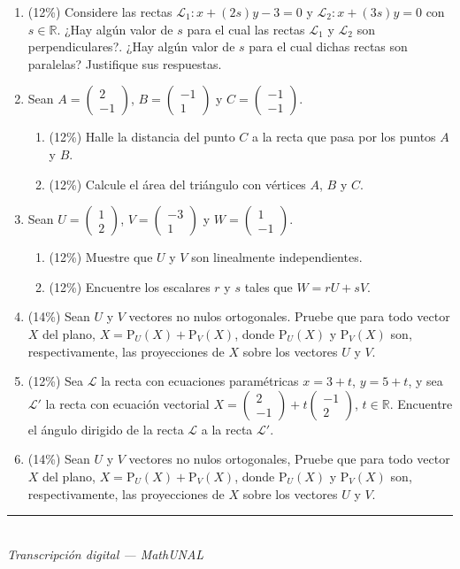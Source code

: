 \documentclass[11pt]{article}
\newcommand{\vect}[2]{\begin{pmatrix}#1\\#2\end{pmatrix}}
\newcommand{\examfooter}{%
  \vfill
  \rule{\linewidth}{0.4pt}\\[1pt]
  {\scriptsize\textit{Transcripción digital --- MathUNAL}\hfill\textcolor{unalblue}{\textbf{\thepage}}}
}
\begin{document}
\begin{enumerate}
\item (12\%) Considere las rectas $\mathcal{L}_1: x+(2s)y-3=0$ y $\mathcal{L}_2: x+(3s)y=0$ con $s\in\mathbb{R}$. ¿Hay algún valor de $s$ para el cual las rectas $\mathcal{L}_1$ y $\mathcal{L}_2$ son perpendiculares?. ¿Hay algún valor de $s$ para el cual dichas rectas son paralelas? Justifique sus respuestas.

\item Sean $A=\vect{2}{-1}$, $B=\vect{-1}{1}$ y $C=\vect{-1}{-1}$.

\begin{enumerate}[label=(\alph*)]
\item (12\%) Halle la distancia del punto $C$ a la recta que pasa por los puntos $A$ y $B$.
\item (12\%) Calcule el área del triángulo con vértices $A$, $B$ y $C$.
\end{enumerate}

\item Sean $U=\vect{1}{2}$, $V=\vect{-3}{1}$ y $W=\vect{1}{-1}$.

\begin{enumerate}[label=(\alph*)]
\item (12\%) Muestre que $U$ y $V$ son linealmente independientes.
\item (12\%) Encuentre los escalares $r$ y $s$ tales que $W=rU+sV$.
\end{enumerate}

\item (14\%) Sean $U$ y $V$ vectores no nulos ortogonales. Pruebe que para todo vector $X$ del plano, $X = \mathrm{P}_U(X) + \mathrm{P}_V(X)$, donde $\mathrm{P}_U(X)$ y $\mathrm{P}_V(X)$ son, respectivamente, las proyecciones de $X$ sobre los vectores $U$ y $V$.

\item (12\%) Sea $\mathcal{L}$ la recta con ecuaciones paramétricas $x=3+t$, $y=5+t$, y sea $\mathcal{L}'$ la recta con ecuación vectorial $X=\vect{2}{-1}+t\vect{-1}{2}$, $t\in\mathbb{R}$. Encuentre el ángulo dirigido de la recta $\mathcal{L}$ a la recta $\mathcal{L}'$.

\item (14\%) Sean $U$ y $V$ vectores no nulos ortogonales, Pruebe que para todo vector $X$ del plano, $X = \mathrm{P}_U(X) + \mathrm{P}_V(X)$, donde $\mathrm{P}_U(X)$ y $\mathrm{P}_V(X)$ son, respectivamente, las proyecciones de $X$ sobre los vectores $U$ y $V$.

\end{enumerate}

\examfooter
\end{document}
